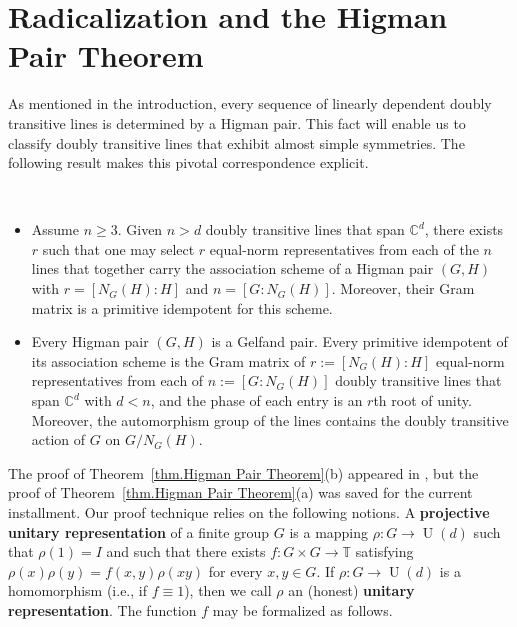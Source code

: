 \section{Radicalization and the Higman Pair Theorem}

As mentioned in the introduction, every sequence of linearly dependent doubly transitive lines is determined by a Higman pair.
This fact will enable us to classify doubly transitive lines that exhibit almost simple symmetries.
The following result makes this pivotal correspondence explicit.

\begin{theorem}\
\label{thm.Higman Pair Theorem}
\begin{itemize}
\item[(a)]
Assume $n\geq 3$.
Given $n>d$ doubly transitive lines that span $\mathbb{C}^d$, there exists $r$ such that one may select $r$ equal-norm representatives from each of the $n$ lines that together carry the association scheme of a Higman pair $(G,H)$ with $r=[N_G(H):H]$ and $n=[G:N_G(H)]$.
Moreover, their Gram matrix is a primitive idempotent for this scheme.
\item[(b)]
Every Higman pair $(G,H)$ is a Gelfand pair.
Every primitive idempotent of its association scheme is the Gram matrix of $r:=[N_G(H):H]$ equal-norm representatives from each of $n:=[G:N_G(H)]$ doubly transitive lines that span $\mathbb{C}^d$ with $d<n$, and the phase of each entry is an $r$th root of unity.
Moreover, the automorphism group of the lines contains the doubly transitive action of $G$ on $G/N_G(H)$.
\end{itemize}
\end{theorem}

The proof of Theorem~\ref{thm.Higman Pair Theorem}(b) appeared in \cite{IversonM:18}, but the proof of Theorem~\ref{thm.Higman Pair Theorem}(a) was saved for the current installment.
Our proof technique relies on the following notions.
A \textbf{projective unitary representation} of a finite group $G$ is a mapping $\rho \colon G \to \operatorname{U}(d)$ such that $\rho(1) = I$ and such that there exists $f \colon G \times G \to \mathbb{T}$ satisfying $\rho(x)\rho(y) = f(x,y) \rho(xy)$ for every $x,y \in G$.
If $\rho\colon G \to \operatorname{U}(d)$ is a homomorphism (i.e., if $f \equiv 1$), then we call $\rho$ an (honest) \textbf{unitary representation}.
The function $f$ may be formalized as follows.

